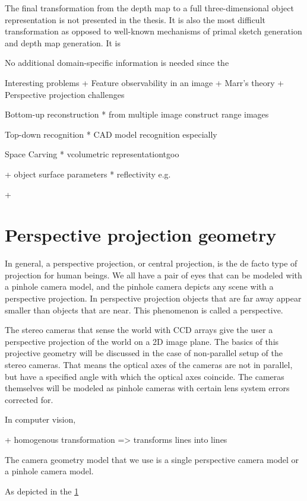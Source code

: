 \documentclass[12pt,a4paper,oneside,pdftex]{report}
\begin{document}
The final transformation from the depth map to a full three-dimensional object representation is not presented in the thesis. It is also the most difficult transformation as opposed to well-known mechanisms of primal sketch generation and depth map generation. It is 


No additional domain-specific information is needed since the 

Interesting problems
+ Feature observability in an image
+ Marr's theory
+ Perspective projection challenges

Bottom-up reconstruction
    * from multiple image construct range images

Top-down recognition
    * CAD model recognition especially

Space Carving
    * vcolumetric representationtgoo


+ object surface parameters
    * reflectivity e.g.
    
+ 

\section{Perspective projection geometry}

In general, a perspective projection, or central projection, is the de facto type of projection for human beings. We all have a pair of eyes that can be modeled with a pinhole camera model, and the pinhole camera depicts any scene with a perspective projection. In perspective projection objects that are far away appear smaller than objects that are near. This phenomenon is called a perspective. 

The stereo cameras that sense the world with CCD arrays give the user a perspective projection of the world on a 2D image plane. The basics of this projective geometry will be discussed in the case of non-parallel setup of the stereo cameras. That means the optical axes of the cameras are not in parallel, but have a specified angle with which the optical axes coincide. The cameras themselves will be modeled as pinhole cameras with certain lens system errors corrected for.

In computer vision, 

+ homogenous transformation => transforms lines into lines



The camera geometry model that we use is a single perspective camera model or a pinhole camera model.


As depicted in the \ref{}
\end{document}
